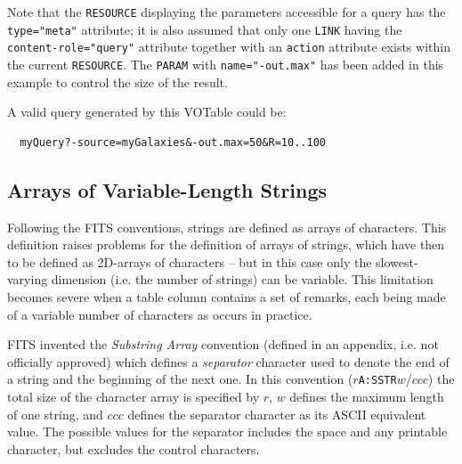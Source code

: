 \documentclass[11pt,a4paper]{ivoa}
\let\fg=\color
\def\attr#1{{\tt{\fg{DarkRed}#1}}}
\def\elem#1{{\tt{\fg{DarkRed}#1}}}
\def\attrval#1#2{{\tt{\fg{DarkRed}#1}="{\fg{DarkPurple}#2}"}}
\def\elemdef#1#2{{\tt\fg{blue}<}{\tt{\fg{DarkRed}#1}#2}{\tt\fg{blue}>}}
\begin{document}
{{{\noindent Note that the {\elem{RESOURCE}} displaying the parameters accessible
for a query has the {\attrval{type}{meta}}
attribute; it is also assumed that only one {\elem{LINK}}
having the {\attrval{content-role}{query}}
attribute together with an {\attr{action}}
attribute exists within the current {\elem{RESOURCE}}.
The \elem{PARAM} with \attrval{name}{-out.max} has been added in this
example to control the size of the result.

A valid query generated by this VOTable could be:

\begin{verbatim}
  myQuery?-source=myGalaxies&-out.max=50&R=10..100
\end{verbatim}


\subsection{Arrays of Variable-Length Strings}
\label{sec:arraystring}
Following the FITS conventions, strings are defined as arrays of
characters. This definition raises problems for the definition
of arrays of strings, which have then to be defined as 2D-arrays
of characters -- but in this case only the slowest-varying dimension
(i.e. the number of strings) can be variable. %
This limitation becomes severe when a table column contains a set
of remarks, each being made of a variable number of characters as
occurs in practice.

FITS invented the {\em Substring Array} convention (defined in an appendix,
i.e. not officially approved) which defines a {\em separator} character
used to denote the end of a string and the beginning of the next one.
In this convention ($r${\tt A:SSTR}$w$/$ccc$) the total size of the character
array is specified by $r$, $w$ defines the maximum length of one string,
and $ccc$ defines the separator character as its ASCII equivalent value.
The possible values for the separator includes the space and any printable
character, but excludes the control characters.

}}}
\end{document}
